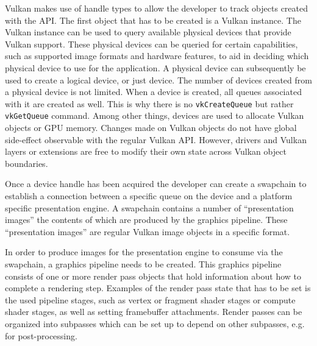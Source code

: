     Vulkan makes use of handle types to allow the developer to track objects created with the API. The first object that has to be created is a Vulkan instance. The Vulkan instance can be used to query available physical devices that provide Vulkan support. These physical devices can be queried for certain capabilities, such as supported image formats and hardware features, to aid in deciding which physical device to use for the application. A physical device can subsequently be used to create a logical device, or just device. The number of devices created from a physical device is not limited. When a device is created, all queues associated with it are created as well. This is why there is no \lstinline{vkCreateQueue} but rather \lstinline{vkGetQueue} command. Among other things, devices are used to allocate Vulkan objects or GPU memory. Changes made on Vulkan objects do not have global side-effect observable with the regular Vulkan API. However, drivers and Vulkan layers or extensions are free to modify their own state across Vulkan object boundaries.

    \begin{figure}
      \caption{}
      \centering
      \label{fig:VulkanInitialization}
    \end{figure}


    Once a device handle has been acquired the developer can create a swapchain to establish a connection between a specific queue on the device and a platform specific presentation engine. A swapchain contains a number of ``presentation images'' the contents of which are produced by the graphics pipeline. These ``presentation images'' are regular Vulkan image objects in a specific format.

    In order to produce images for the presentation engine to consume via the swapchain, a graphics pipeline needs to be created. This graphics pipeline consists of one or more render pass objects that hold information about how to complete a rendering step. Examples of the render pass state that has to be set is the used pipeline stages, such as vertex or fragment shader stages or compute shader stages, as well as setting framebuffer attachments. Render passes can be organized into subpasses which can be set up to depend on other subpasses, e.g. for post-processing.

